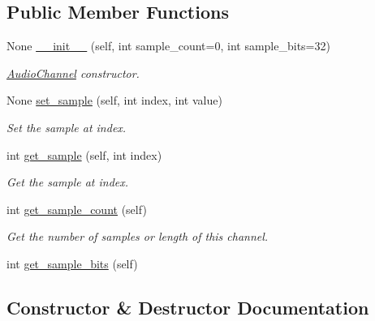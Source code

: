 \subsection*{Public Member Functions}
\begin{DoxyCompactItemize}
\item 
None \mbox{\hyperlink{classbridges_1_1audio__channel_1_1_audio_channel_a90cb825bab6d3a52460a8f9aaa106d96}{\+\_\+\+\_\+init\+\_\+\+\_\+}} (self, int sample\+\_\+count=0, int sample\+\_\+bits=32)
\begin{DoxyCompactList}\small\item\em \mbox{\hyperlink{classbridges_1_1audio__channel_1_1_audio_channel}{Audio\+Channel}} constructor. \end{DoxyCompactList}\item 
None \mbox{\hyperlink{classbridges_1_1audio__channel_1_1_audio_channel_a963deb0f627c15ad43e354dc239a22ff}{set\+\_\+sample}} (self, int index, int value)
\begin{DoxyCompactList}\small\item\em Set the sample at index. \end{DoxyCompactList}\item 
int \mbox{\hyperlink{classbridges_1_1audio__channel_1_1_audio_channel_a092c000cf26061418b9c9016c32e231d}{get\+\_\+sample}} (self, int index)
\begin{DoxyCompactList}\small\item\em Get the sample at index. \end{DoxyCompactList}\item 
int \mbox{\hyperlink{classbridges_1_1audio__channel_1_1_audio_channel_a121180fc9b1432fe71f962ff7c97dd13}{get\+\_\+sample\+\_\+count}} (self)
\begin{DoxyCompactList}\small\item\em Get the number of samples or length of this channel. \end{DoxyCompactList}\item 
int \mbox{\hyperlink{classbridges_1_1audio__channel_1_1_audio_channel_a6ee6a46e925354fd26f8f67e3357c2b4}{get\+\_\+sample\+\_\+bits}} (self)
\end{DoxyCompactItemize}


\subsection{Constructor \& Destructor Documentation}
\mbox{\label{classbridges_1_1audio__channel_1_1_audio_channel_a90cb825bab6d3a52460a8f9aaa106d96}} 

